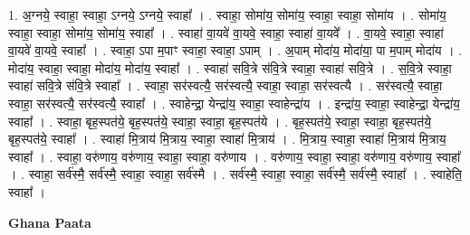 \documentclass[17pt]{extarticle}
\begin{document}
1. अ॒ग्नये॒ स्वाहा॒ स्वाहा॒ ऽग्नये॒ ऽग्नये॒ स्वाहा᳚ । . स्वाहा॒ सोमा॑य॒ सोमा॑य॒ स्वाहा॒ स्वाहा॒ सोमा॑य । . सोमा॑य॒ स्वाहा॒ स्वाहा॒ सोमा॑य॒ सोमा॑य॒ स्वाहा᳚ । . स्वाहा॑ वा॒यवे॑ वा॒यवे॒ स्वाहा॒ स्वाहा॑ वा॒यवे᳚ । . वा॒यवे॒ स्वाहा॒ स्वाहा॑ वा॒यवे॑ वा॒यवे॒ स्वाहा᳚ । . स्वाहा॒ ऽपा म॒पाꣳ स्वाहा॒ स्वाहा॒ ऽपाम् । . अ॒पाम् मोदा॑य॒ मोदा॑या॒ पा म॒पाम् मोदा॑य । . मोदा॑य॒ स्वाहा॒ स्वाहा॒ मोदा॑य॒ मोदा॑य॒ स्वाहा᳚ । . स्वाहा॑ सवि॒त्रे स॑वि॒त्रे स्वाहा॒ स्वाहा॑ सवि॒त्रे । . स॒वि॒त्रे स्वाहा॒ स्वाहा॑ सवि॒त्रे स॑वि॒त्रे स्वाहा᳚ । . स्वाहा॒ सर॑स्वत्यै॒ सर॑स्वत्यै॒ स्वाहा॒ स्वाहा॒ सर॑स्वत्यै । . सर॑स्वत्यै॒ स्वाहा॒ स्वाहा॒ सर॑स्वत्यै॒ सर॑स्वत्यै॒ स्वाहा᳚ । . स्वाहेन्द्रा॒ येन्द्रा॑य॒ स्वाहा॒ स्वाहेन्द्रा॑य । . इन्द्रा॑य॒ स्वाहा॒ स्वाहेन्द्रा॒ येन्द्रा॑य॒ स्वाहा᳚ । . स्वाहा॒ बृह॒स्पत॑ये॒ बृह॒स्पत॑ये॒ स्वाहा॒ स्वाहा॒ बृह॒स्पत॑ये । . बृह॒स्पत॑ये॒ स्वाहा॒ स्वाहा॒ बृह॒स्पत॑ये॒ बृह॒स्पत॑ये॒ स्वाहा᳚ । . स्वाहा॑ मि॒त्राय॑ मि॒त्राय॒ स्वाहा॒ स्वाहा॑ मि॒त्राय॑ । . मि॒त्राय॒ स्वाहा॒ स्वाहा॑ मि॒त्राय॑ मि॒त्राय॒ स्वाहा᳚ । . स्वाहा॒ वरु॑णाय॒ वरु॑णाय॒ स्वाहा॒ स्वाहा॒ वरु॑णाय । . वरु॑णाय॒ स्वाहा॒ स्वाहा॒ वरु॑णाय॒ वरु॑णाय॒ स्वाहा᳚ । . स्वाहा॒ सर्व॑स्मै॒ सर्व॑स्मै॒ स्वाहा॒ स्वाहा॒ सर्व॑स्मै । . सर्व॑स्मै॒ स्वाहा॒ स्वाहा॒ सर्व॑स्मै॒ सर्व॑स्मै॒ स्वाहा᳚ । . स्वाहेति॒ स्वाहा᳚ । \newline

\textbf{Ghana Paata } \newline
\end{document}
